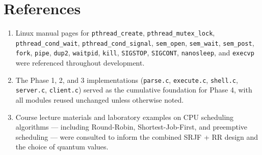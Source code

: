 \documentclass[12pt]{article}
\begin{document}
\section{References}

\begin{enumerate}
    \item Linux manual pages for \texttt{pthread\_create}, \texttt{pthread\_mutex\_lock},
          \texttt{pthread\_cond\_wait}, \texttt{pthread\_cond\_signal},
          \texttt{sem\_open}, \texttt{sem\_wait}, \texttt{sem\_post},
          \texttt{fork}, \texttt{pipe}, \texttt{dup2}, \texttt{waitpid},
          \texttt{kill}, \texttt{SIGSTOP}, \texttt{SIGCONT}, \texttt{nanosleep},
          and \texttt{execvp} were referenced throughout development.

    \item The Phase 1, 2, and 3 implementations (\texttt{parse.c}, \texttt{execute.c},
          \texttt{shell.c}, \texttt{server.c}, \texttt{client.c}) served as the
          cumulative foundation for Phase 4, with all modules reused unchanged unless
          otherwise noted.

    \item Course lecture materials and laboratory examples on CPU scheduling algorithms
          --- including Round-Robin, Shortest-Job-First, and preemptive scheduling ---
          were consulted to inform the combined SRJF + RR design and the choice of
          quantum values.
\end{enumerate}
\end{document}

